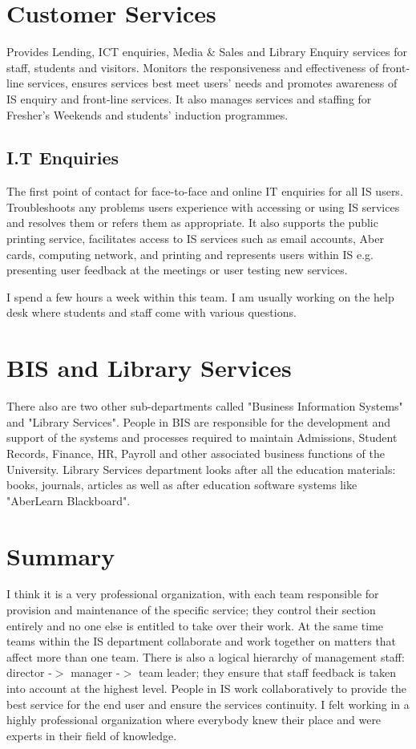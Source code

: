 \documentclass[10pt,a4paper,headinclude=true,twoside]{report}
\begin{document}
\section{Customer Services}
Provides Lending, ICT enquiries, Media \& Sales and Library Enquiry services for staff, students and visitors. Monitors the responsiveness and effectiveness of front-line services, ensures services best meet users' needs and promotes awareness of IS enquiry and front-line services. It also manages services and staffing for Fresher's Weekends and students' induction programmes.\cite{InternalTeamdescription}
\subsection{I.T Enquiries}
The first point of contact for face-to-face and online IT enquiries for all IS users. Troubleshoots any problems users experience with accessing or using IS services and resolves them or refers them as appropriate. It also supports the public printing service, facilitates access to IS services such as email accounts, Aber cards, computing network, and printing and represents users within IS e.g. presenting user feedback at the meetings or user testing new services. \cite{InternalTeamdescription}

I spend a few hours a week within this team. I am usually working on the help desk where students and staff come with various questions.

\section{BIS and Library Services}
There also are two other sub-departments called "Business Information Systems" and "Library Services". People in BIS are  responsible for the development and support of the systems and processes required to maintain Admissions, Student Records, Finance, HR, Payroll and other associated business functions of the University. Library Services department looks after all the education materials: books, journals, articles as well as after education software systems like "AberLearn Blackboard".\cite{InternalTeamdescription}

\section{Summary}
I think it is a very professional organization, with each team responsible for provision and maintenance of the specific service; they control their section entirely and no one else is entitled to take over their work. At the same time teams within the IS department collaborate and work together on matters that affect more than one team. There is also a logical hierarchy of management staff: director -$>$ manager -$>$ team leader; they ensure that staff feedback is taken into account at the highest level. People in IS work collaboratively to provide the best service for the end user and ensure the services continuity. I felt working in a highly professional organization where everybody knew their place and were experts in their field of knowledge.
\end{document}
